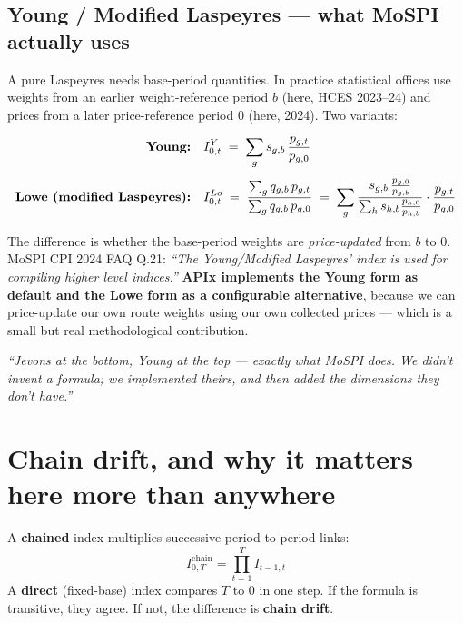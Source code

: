 \subsection{Young / Modified Laspeyres --- what MoSPI actually uses}

A pure Laspeyres needs base-period quantities. In practice statistical offices use weights
from an earlier weight-reference period $b$ (here, HCES 2023--24) and prices from a later
price-reference period $0$ (here, 2024). Two variants:

\begin{align}
\text{\bf Young:}\quad & I^{Y}_{0,t} \;=\; \sum_g s_{g,b}\,\frac{p_{g,t}}{p_{g,0}} \\[4pt]
\text{\bf Lowe (modified Laspeyres):}\quad & I^{Lo}_{0,t} \;=\;
\frac{\sum_g q_{g,b}\,p_{g,t}}{\sum_g q_{g,b}\,p_{g,0}}
\;=\; \sum_g \frac{s_{g,b}\,\frac{p_{g,0}}{p_{g,b}}}{\sum_h s_{h,b}\frac{p_{h,0}}{p_{h,b}}}\cdot\frac{p_{g,t}}{p_{g,0}}
\end{align}

\noindent The difference is whether the base-period weights are \emph{price-updated} from
$b$ to $0$. MoSPI CPI 2024 FAQ Q.21: \emph{``The Young/Modified Laspeyres' index is used for
compiling higher level indices.''} \textbf{APIx implements the Young form as default and the
Lowe form as a configurable alternative}, because we can price-update our own route weights
using our own collected prices --- which is a small but real methodological contribution.

\begin{keybox}
\emph{``Jevons at the bottom, Young at the top --- exactly what MoSPI does. We didn't
invent a formula; we implemented theirs, and then added the dimensions they don't have.''}
\end{keybox}

\section{Chain drift, and why it matters here more than anywhere}

A \textbf{chained} index multiplies successive period-to-period links:
\begin{equation}
I^{\text{chain}}_{0,T} = \prod_{t=1}^{T} I_{t-1,t}
\end{equation}
A \textbf{direct} (fixed-base) index compares $T$ to $0$ in one step. If the formula is
transitive, they agree. If not, the difference is \textbf{chain drift}.

